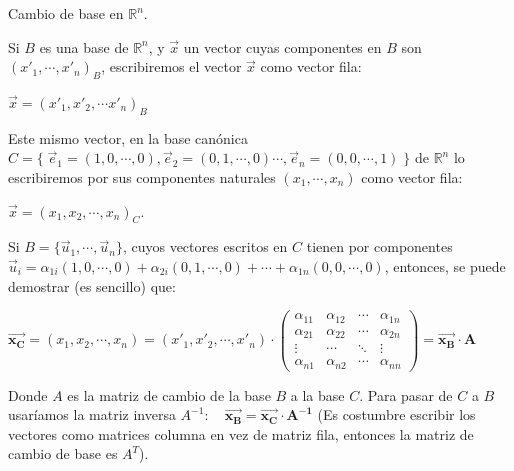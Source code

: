 \begin{theorem}

{Cambio de base en $\mathbb R^n$}.

Si $B$ es una base de $\mathbb R^n$, y $\vec x$ un vector cuyas componentes en $B$ son $(x'_1,\cdots ,x'_n)_B$, escribiremos el vector  $\vec x$  como vector fila:

 $\vec x =\left( x'_1, x'_2, \cdots x'_n \right)_B $ 
 
 Este mismo vector, en la base canónica $C=\{\; \vec e_1=(1,0,\cdots ,0),\vec e_2=(0,1,\cdots, 0) \cdots , \vec e_n=(0,0,\cdots ,1)\; \}$ de $\mathbb R^n$ lo escribiremos  por sus componentes naturales $(x_1,\cdots ,x_n)$ como vector fila:
 
  $\vec x =\left( x_1, x_2, \cdots , x_n \right)_C $.
  
  Si $B=\{\vec u_1, \cdots , \vec u_n\}$, cuyos vectores escritos en $C$ tienen por componentes $\vec u_i=\alpha_{1i} (1,0,\cdots ,0) + \alpha_{2i}(0,1,\cdots, 0)+ \cdots + \alpha_{1n}(0,0,\cdots ,0)$, entonces, se puede demostrar \textcolor{gris}{(es sencillo)} que:
  
 \noindent  \small{$\boldsymbol{\vec {x_C}} = (x_1, x_2, \cdots, x_n) = (x'_1, x'_2, \cdots , x'_n) \cdot\left( \begin{matrix} 
  \alpha_{11} & \alpha_{12}&\cdots & \alpha_{1n} \\
  \alpha_{21} & \alpha_{22}& \cdots & \alpha_{2n} \\
  \vdots & \cdots &\ddots & \vdots \\
  \alpha_{n1} & \alpha_{n2}& \cdots & \alpha_{nn}
  \end{matrix} \right) =\boldsymbol{ \vec {x_B} \cdot A }$} 

\normalsize{Donde} $A$ es la matriz de cambio de la base $B$ a la base $C$. Para pasar de $C$ a $B$ usaríamos la matriz inversa $A^{-1}: \quad \boldsymbol{\vec{x_B}=\vec {x_C}\cdot A^{-1} }$ (Es costumbre escribir los vectores como matrices columna en vez de matriz fila, entonces la matriz de cambio de base es $A^T$).
  
\end{theorem}

